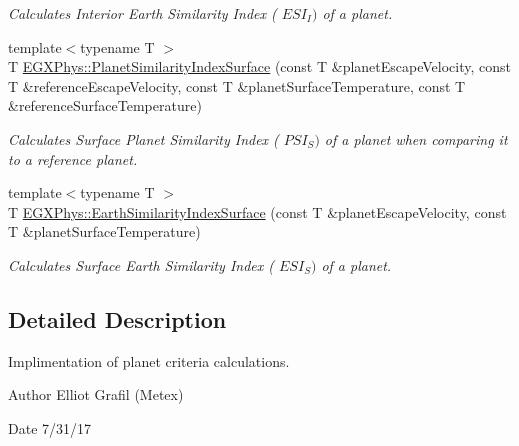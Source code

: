 \begin{DoxyCompactItemize}
\begin{DoxyCompactList}\small\item\em Calculates Interior Earth Similarity Index ( $ESI_I)$ of a planet. \end{DoxyCompactList}\item 
{\footnotesize template$<$typename T $>$ }\\T \hyperlink{group___e_g_x_phys-_planet_similarity_index_gae0c7dce2779d66b0560ca388a34ddc39}{E\+G\+X\+Phys\+::\+Planet\+Similarity\+Index\+Surface} (const T \&planet\+Escape\+Velocity, const T \&reference\+Escape\+Velocity, const T \&planet\+Surface\+Temperature, const T \&reference\+Surface\+Temperature)
\begin{DoxyCompactList}\small\item\em Calculates Surface Planet Similarity Index ( $PSI_S)$ of a planet when comparing it to a reference planet. \end{DoxyCompactList}\item 
{\footnotesize template$<$typename T $>$ }\\T \hyperlink{group___e_g_x_phys-_planet_similarity_index_ga1df772b0ed354ca7f7e4a7a4af072325}{E\+G\+X\+Phys\+::\+Earth\+Similarity\+Index\+Surface} (const T \&planet\+Escape\+Velocity, const T \&planet\+Surface\+Temperature)
\begin{DoxyCompactList}\small\item\em Calculates Surface Earth Similarity Index ( $ESI_S)$ of a planet. \end{DoxyCompactList}\end{DoxyCompactItemize}


\subsection{Detailed Description}
Implimentation of planet criteria calculations. 

\begin{DoxyAuthor}{Author}
Elliot Grafil (Metex) 
\end{DoxyAuthor}
\begin{DoxyDate}{Date}
7/31/17 
\end{DoxyDate}
